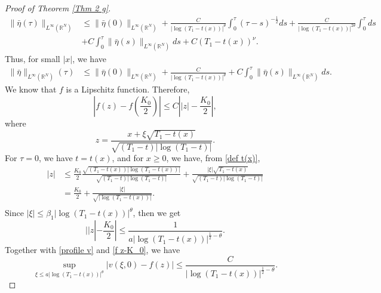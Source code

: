 \documentclass[10pt,a4paper]{amsart}
\newcommand{\R}{\numberset{R}}
\newcommand{\numberset}{\mathbb}
\begin{document}
\begin{proof}[Proof of Theorem \ref{Thm 2 g}]
\begin{equation}\label{control bar eta}
\begin{split}
\|\bar{\eta}(\tau)\|_{L^\infty(\R^N)}&\leq\|\bar{\eta}(0)\|_{L^\infty(\R^N)}+\frac{C}{|\log (T_1-t(x))|^{\theta}}\int^\tau_0(\tau-s)^{-\frac{1}{2}}ds+\frac{C}{|\log (T_1-t(x))|^{2\theta}}\int^\tau_0ds\\
&+C\int^\tau_0 \|\bar{\eta}(s)\|_{L^\infty(\R^N)}ds+C(T_1-t(x))^{\nu}.
\end{split}
\end{equation}
Thus, for small $|x|$, we have
\begin{equation}\label{eta 0 left 2}
\begin{split}
\|\bar{\eta}\|_{L^\infty(\R^N)}(\tau)&\leq\|\bar{\eta}(0)\|_{L^\infty(\R^N)}+\frac{C}{|\log (T_1-t(x))|^{\theta}}+C\int^\tau_0 \|\bar{\eta}(s)\|_{L^\infty(\R^N)}ds.
\end{split}
\end{equation}
We know that $f$ is a Lipschitz function. Therefore,
\begin{equation}\label{f z-K_0}
\left|f(z)-f\left(\frac{K_0}{2}\right)\right|\leq C\left||z|-\frac{K_0}{2}\right|,
\end{equation}
where 
$$z=\frac{x+\xi\sqrt{T_1-t(x)}}{\sqrt{(T_1-t)|\log(T_1-t)|}}.$$
For $\tau =0$, we have $t=t(x)$, and for $x\geq 0$, we have, from \eqref{def t(x)},
\begin{equation*}
\begin{split}
|z|&\leq\frac{K_0}{2}\frac{\sqrt{(T_1-t(x))|\log(T_1-t(x))|}}{\sqrt{(T_1-t)|\log(T_1-t)|}}+\frac{|\xi|\sqrt{T_1-t(x)}}{\sqrt{(T_1-t)|\log(T_1-t)|}}\\
&=\frac{K_0}{2}+\frac{|\xi|}{\sqrt{|\log(T_1-t(x))|}}.\\
\end{split}
\end{equation*}
Since $|\xi|\leq \beta_1|\log(T_1-t(x))|^\theta$, then we get
\begin{equation*}
||z|-\frac{K_0}{2}|\leq \frac{1}{a|\log(T_1-t(x))|^{\frac{1}{2}-\theta}}.
\end{equation*}
Together with \eqref{profile v} and \eqref{f z-K_0}, we have 
\begin{equation*}
\underset{\xi\leq a |\log(T_1-t(x))|^{\theta}}{\sup}\left|v(\xi,0)-f(z)\right|\leq \frac{C}{|\log(T_1-t(x))|^{\frac{1}{2}-\theta}}.

\end{equation*}
\end{proof}
\end{document}
